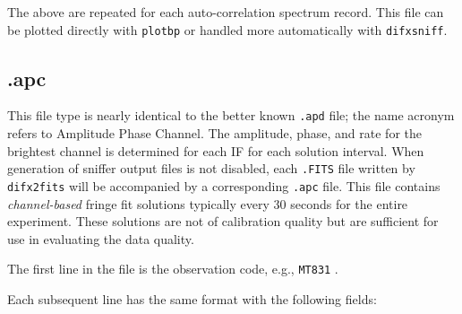 \noindent
The above are repeated for each auto-correlation spectrum record.
This file can be plotted directly with {\tt plotbp} or handled more automatically with {\tt difxsniff}.







\subsection{.apc} \label{sec:apc}

This file type is nearly identical to the better known {\tt .apd} file; the name acronym refers to Amplitude Phase Channel.
The amplitude, phase, and rate for the brightest channel is determined for each IF for each solution interval.
When generation of sniffer output files is not disabled, each {\tt .FITS} file written by {\tt difx2fits} will be accompanied by a corresponding {\tt .apc} file. 
This file contains {\em channel-based} fringe fit solutions typically every 30 seconds for the entire experiment.
These solutions are not of calibration quality but are sufficient for use in evaluating the data quality.

The first line in the file is the observation code, e.g., {\tt MT831} .

Each subsequent line has the same format with the following fields:

